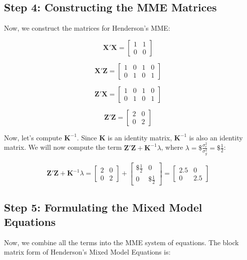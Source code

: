 \documentclass[12pt,a4paper]{article}
\begin{document}
\subsection*{Step 4: Constructing the MME Matrices}

Now, we construct the matrices for Henderson's MME:

\[
\mathbf{X'X} = 
\begin{bmatrix}
    1 & 1 \\
    0 & 0
\end{bmatrix}
\]

\[
\mathbf{X'Z} = 
\begin{bmatrix}
    1 & 0 & 1 & 0 \\
    0 & 1 & 0 & 1
\end{bmatrix}
\]

\[
\mathbf{Z'X} = 
\begin{bmatrix}
    1 & 0 & 1 & 0 \\
    0 & 1 & 0 & 1
\end{bmatrix}
\]

\[
\mathbf{Z'Z} = 
\begin{bmatrix}
    2 & 0 \\
    0 & 2
\end{bmatrix}
\]

Now, let's compute $\mathbf{K}^{-1}$. Since $\mathbf{K}$ is an identity matrix, $\mathbf{K}^{-1}$ is also an identity matrix. We will now compute the term $\mathbf{Z'Z} + \mathbf{K}^{-1}\lambda$, where $\lambda = \$\displaystyle\frac{\sigma^2_e}{\sigma^2_g} = \$\displaystyle\frac{1}{2}$:

\[
\mathbf{Z'Z} + \mathbf{K}^{-1} \lambda = 
\begin{bmatrix}
    2 & 0 \\
    0 & 2
\end{bmatrix}
+ 
\begin{bmatrix}
    \$\displaystyle\frac{1}{2} & 0 \\
    0 & \$\displaystyle\frac{1}{2}
\end{bmatrix}
=
\begin{bmatrix}
    2.5 & 0 \\
    0 & 2.5
\end{bmatrix}
\]

\subsection*{Step 5: Formulating the Mixed Model Equations}

Now, we combine all the terms into the MME system of equations. The block matrix form of Henderson’s Mixed Model Equations is:
\end{document}
